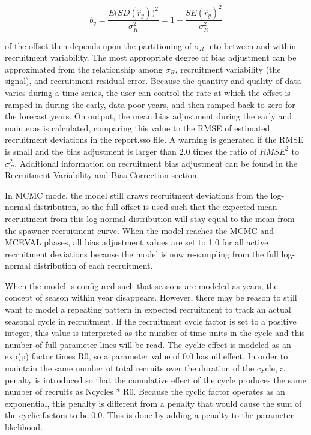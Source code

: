 \begin{equation}
	b_y=\frac{E\Big( SD(\hat{r}_y)\Big)^2}{\sigma^2_R}=1-\frac{SE(\hat{r}_y)^2}{\sigma^2_R}
\end{equation}

\noindent of the offset then depends upon the partitioning of $\sigma_R$ into between and within recruitment variability. The most appropriate degree of bias adjustment can be approximated from the relationship among $\sigma_R$, recruitment variability (the signal), and recruitment residual error. Because the quantity and quality of data varies during a time series, the user can control the rate at which the offset is ramped in during the early, data-poor years, and then ramped back to zero for the forecast years. On output, the mean bias adjustment during the early and main eras is calculated, comparing this value to the RMSE of estimated recruitment deviations in the report.sso file. A warning is generated if the RMSE is small and the bias adjustment is larger than 2.0 times the ratio of $RMSE^2$ to $\sigma^2_R$. Additional information on recruitment bias adjustment can be found in the \hyperlink{BiasCorrect}{Recruitment Variability and Bias Correction section}.

In MCMC mode, the model still draws recruitment deviations from the log-normal distribution, so the full offset is used such that the expected mean recruitment from this log-normal distribution will stay equal to the mean from the spawner-recruitment curve. When the model reaches the MCMC and MCEVAL phases, all bias adjustment values are set to 1.0 for all active recruitment deviations because the model is now re-sampling from the full log-normal distribution of each recruitment.

When the model is configured such that seasons are modeled as years, the concept of season within year disappears. However, there may be reason to still want to model a repeating pattern in expected recruitment to track an actual seasonal cycle in recruitment. If the recruitment cycle factor is set to a positive integer, this value is interpreted as the number of time units in the cycle and this number of full parameter lines will be read. The cyclic effect is modeled as an exp(p) factor times R0, so a parameter value of 0.0 has nil effect. In order to maintain the same number of total recruits over the duration of the cycle, a penalty is introduced so that the cumulative effect of the cycle produces the same number of recruits as Ncycles * R0. Because the cyclic factor operates as an exponential, this penalty is different from a penalty that would cause the sum of the cyclic factors to be 0.0. This is done by adding a penalty to the parameter likelihood. %

